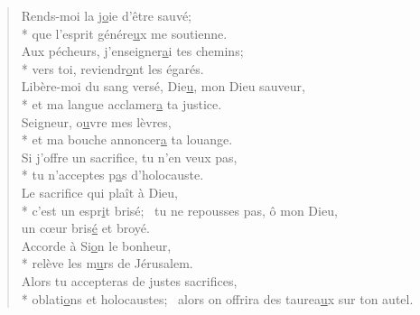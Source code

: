 \begin{verse}
Rends-moi la j\underline{o}ie d’être sauvé; \\*
que l’esprit génére\underline{u}x me soutienne. \\
Aux pécheurs, j’enseigner\underline{a}i tes chemins; \\*
vers toi, reviendr\underline{o}nt les égarés. \\

Libère-moi du sang versé, Die\underline{u}, mon Dieu sauveur, \\*
et ma langue acclamer\underline{a} ta justice. \\
Seigneur, o\underline{u}vre mes lèvres, \\*
et ma bouche annoncer\underline{a} ta louange. \\

Si j’offre un sacrif\underline{i}ce, tu n’en veux pas, \\*
tu n’acceptes p\underline{a}s d’holocauste. \\
Le sacrifice qui plaît à Dieu, \\*
c’est un espr\underline{i}t brisé;~\psalmstar
tu ne repousses pas, ô mon Dieu, \\
un cœur bris\underline{é} et broyé. \\

Accorde à Si\underline{o}n le bonheur, \\*
relève les m\underline{u}rs de Jérusalem. \\
Alors tu accepteras de justes sacrifices, \\*
oblati\underline{o}ns et holocaustes;~\psalmstar
alors on offrira des taurea\underline{u}x sur ton autel. \\
\end{verse}

